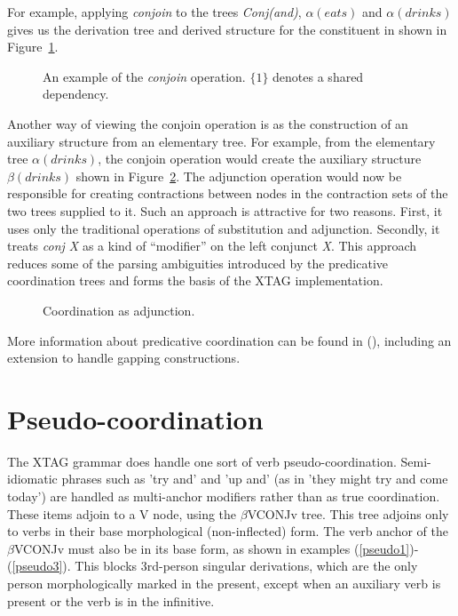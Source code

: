 For example, applying {\em conjoin\/} to the trees {\em Conj(and)},
$\alpha(eats)$ and $\alpha(drinks)$ gives us the derivation tree and
derived structure for the constituent in  shown in
Figure~\ref{fig:vpc}.


\begin{figure}[htbp]
  \begin{center}
    \leavevmode
  \end{center}
  \caption{An example of the {\em conjoin\/} operation. $\{1\}$
    denotes a shared dependency.}
  \label{fig:vpc}
\end{figure}

Another way of viewing the conjoin operation is as the construction of
an auxiliary structure from an elementary tree. For example, from the
elementary tree $\alpha(drinks)$, the conjoin operation would create
the auxiliary structure $\beta(drinks)$ shown in
Figure~\ref{fig:aux-conj}. The adjunction operation would now be
responsible for creating contractions between nodes in the contraction
sets of the two trees supplied to it. Such an approach is attractive
for two reasons. First, it uses only the traditional operations of
substitution and adjunction. Secondly, it treats {\em conj X} as a
kind of ``modifier'' on the left conjunct {\em X}. This approach
reduces some of the parsing ambiguities introduced by the predicative
coordination trees and forms the basis of the XTAG implementation.

\begin{figure}[htbp]
  \begin{center}
    \leavevmode
  \end{center}
  \caption{Coordination as adjunction.}
  \label{fig:aux-conj}
\end{figure}

More information about predicative coordination can be found in
(\cite{anoopjoshi96}), including an extension to handle gapping constructions.

\section{Pseudo-coordination}

The XTAG grammar does handle one sort of verb pseudo-coordination. 
Semi-idiomatic phrases such as 'try and' and 'up and' (as in 'they might 
try and come today') are handled as multi-anchor modifiers 
rather than as true coordination. These items adjoin to a V node, using 
the $\beta$VCONJv tree. This tree adjoins only to verbs in their base 
morphological (non-inflected) form. The verb anchor of the $\beta$VCONJv 
must also be in its base form, as shown in examples 
(\ref{pseudo1})-(\ref{pseudo3}). This blocks 3rd-person singular derivations, 
which are the only person morphologically marked in the present, except when 
an auxiliary verb is present or the verb is in the infinitive.

